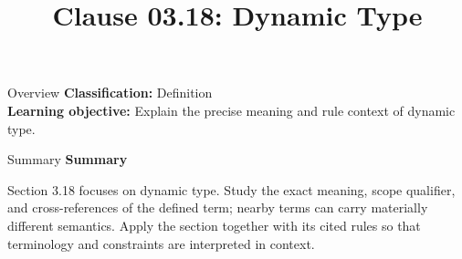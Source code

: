 \documentclass[10pt,letterpaper]{article}
\title{Clause 03.18: Dynamic Type}
\author{}
\date{}
\begin{document}
\maketitle
\begin{CornellOverviewBox}{Overview}
\textbf{Classification:} Definition\\[2pt]
\textbf{Learning objective:} Explain the precise meaning and rule context of dynamic type.
\end{CornellOverviewBox}\begin{CornellSummaryBox}{Summary}
{\sffamily\bfseries\color{Accent} Summary}\par\vspace{3pt}Section 3.18 focuses on dynamic type. Study the exact meaning, scope qualifier, and cross-references of the defined term; nearby terms can carry materially different semantics. Apply the section together with its cited rules so that terminology and constraints are interpreted in context.
\end{CornellSummaryBox}
\end{document}
